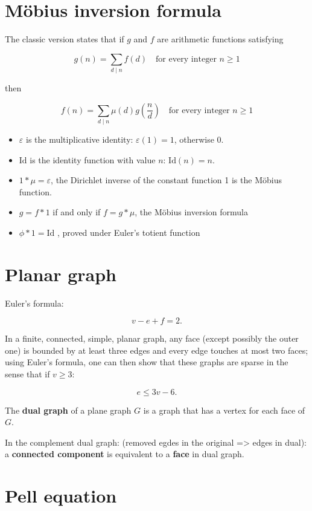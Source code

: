 \documentclass[a4paper]{article}
\begin{document}
\begin{landscape}
\begin{multicols}{2}
\section{Möbius inversion formula}
The classic version states that if $g$ and $f$ are arithmetic functions satisfying

$$ g(n)=\sum _{d\mid n}f(d)\quad {\text{for every integer }}n\geq 1$$

then

$$ f(n)=\sum _{d\mid n}\mu (d)g\left({\frac {n}{d}}\right)\quad {\text{for every integer }}n\geq 1$$

\begin{itemize}
    \item $\varepsilon$  is the multiplicative identity: $ \varepsilon (1)=1$, otherwise 0.
    \item ${\text{Id}}$ is the identity function with value $n$: $ {\text{Id}}(n)=n$.
    \item $ 1*\mu =\varepsilon $, the Dirichlet inverse of the constant function 1 is the Möbius function.
    \item $g=f*1$ if and only if $f=g*\mu$, the Möbius inversion formula
    \item$ \phi *1={\text{Id}}$ , proved under Euler's totient function
\end{itemize}

\section{Planar graph}

Euler's formula:

$$v-e+f=2.$$

In a finite, connected, simple, planar graph, any face (except possibly the outer one) is bounded by at least three edges and every edge touches at most two faces; using Euler's formula, one can then show that these graphs are sparse in the sense that if $v \geq 3$:

$$e\leq 3v-6.$$

The \textbf{dual graph} of a plane graph $G$ is a graph that has a vertex for each face of $G$.

In the complement dual graph: (removed egdes in the original => edges in dual): a \textbf{connected component} is equivalent to a \textbf{face} in dual graph.

\section{Pell equation}


\end{multicols}
\end{landscape}
\end{document}
